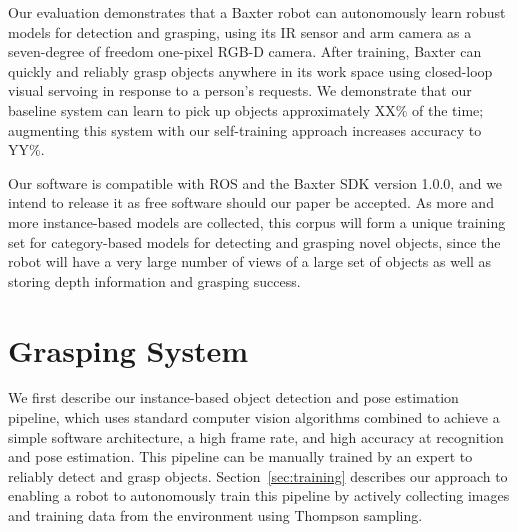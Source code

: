 \documentclass{article}
\begin{document}

Our evaluation demonstrates that a Baxter robot can autonomously learn
robust models for detection and grasping, using its IR sensor and arm
camera as a seven-degree of freedom one-pixel RGB-D camera.  After
training, Baxter can quickly and reliably grasp objects anywhere in
its work space using closed-loop visual servoing in response to a
person's requests.  We demonstrate that our baseline system can learn
to pick up objects approximately XX\% of the time; augmenting this
system with our self-training approach increases accuracy to YY\%.

Our software is compatible with ROS and the Baxter SDK version 1.0.0,
and we intend to release it as free software should our paper be
accepted.  As more and more instance-based models are collected, this
corpus will form a unique training set for category-based models for
detecting and grasping novel objects, since the robot will have a very
large number of views of a large set of objects as well as storing
depth information and grasping success.


\section{Grasping System}

We first describe our instance-based object detection and pose
estimation pipeline, which uses standard computer vision algorithms
combined to achieve a simple software architecture, a high frame rate,
and high accuracy at recognition and pose estimation.  This pipeline
can be manually trained by an expert to reliably detect and grasp
objects.  Section~\ref{sec:training} describes our approach to
enabling a robot to autonomously train this pipeline by actively
collecting images and training data from the environment using
Thompson sampling.
\end{document}
